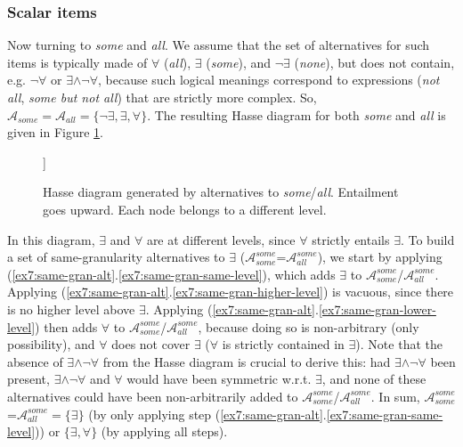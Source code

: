 \subsubsection{Scalar items}
Now turning to \textit{some} and \textit{all}. We assume that the set of alternatives for such items is typically made of $\forall$ (\textit{all}), $\exists$ (\textit{some}), and $\neg\exists$ (\textit{none}), but does not contain, e.g. $\neg\forall$ or $\exists\wedge\neg\forall$, because such logical meanings correspond to expressions (\textit{not all}, \textit{some but not all}) that are strictly more complex. So, $\mathcal{A}_{\textit{some}}=\mathcal{A}_{\textit{all}}=\lbrace \neg\exists, \exists, \forall\rbrace$. The resulting Hasse diagram for both \textit{some} and \textit{all} is given in Figure \ref{fig7:some-all-hasse}.

\begin{figure}[H]
	\centering
	\begin{forest}
		[$\exists$[$\forall$]]
	\end{forest}
	\begin{forest}
		[$\neg\exists$]
	\end{forest}
	\caption{Hasse diagram generated by alternatives to \textit{some}/\textit{all}. Entailment goes upward. Each node belongs to a different level.}
	\label{fig7:some-all-hasse}
\end{figure}

In this diagram, $\exists$ and $\forall$ are at different levels, since $\forall$ strictly entails $\exists$. To build a set of same-granularity alternatives to $\exists$ ($\mathcal{A}_{\textit{some}}^{\textit{some}}$=$\mathcal{A}_{\textit{all}}^{\textit{some}}$), we start by applying (\ref{ex7:same-gran-alt}.\ref{ex7:same-gran-same-level}), which adds $\exists$ to $\mathcal{A}_{\textit{some}}^{\textit{some}}$/$\mathcal{A}_{\textit{all}}^{\textit{some}}$. Applying (\ref{ex7:same-gran-alt}.\ref{ex7:same-gran-higher-level}) is vacuous, since there is no higher level above $\exists$. Applying (\ref{ex7:same-gran-alt}.\ref{ex7:same-gran-lower-level}) then adds $\forall$ to $\mathcal{A}_{\textit{some}}^{\textit{some}}$/$\mathcal{A}_{\textit{all}}^{\textit{some}}$, because doing so is non-arbitrary (only possibility), and $\forall$ does not cover $\exists$ ($\forall$ is strictly contained in $\exists$). Note that the absence of $\exists\wedge\neg\forall$ from the Hasse diagram is crucial to derive this: had $\exists\wedge\neg\forall$ been present, $\exists\wedge\neg\forall$ and $\forall$ would have been symmetric w.r.t. $\exists$, and none of these alternatives could have been non-arbitrarily added to $\mathcal{A}_{\textit{some}}^{\textit{some}}$/$\mathcal{A}_{\textit{all}}^{\textit{some}}$. In sum, $\mathcal{A}_{\textit{some}}^{\textit{some}}$=$\mathcal{A}_{\textit{all}}^{\textit{some}} = \lbrace\exists\rbrace$ (by only applying step (\ref{ex7:same-gran-alt}.\ref{ex7:same-gran-same-level})) or $\lbrace\exists, \forall\rbrace$ (by applying all steps).\\

